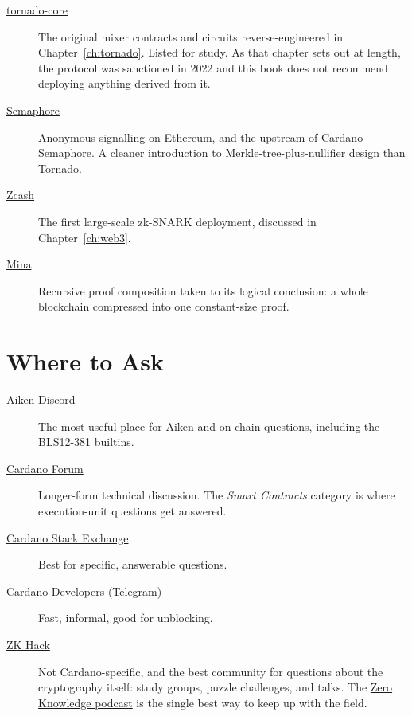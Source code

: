 \begin{description}
  \item[\href{https://github.com/tornadocash/tornado-core}{tornado-core}]
    The original mixer contracts and circuits reverse-engineered in
    Chapter~\ref{ch:tornado}. Listed for study. As that chapter sets out at
    length, the protocol was sanctioned in 2022 and this book does not
    recommend deploying anything derived from it.

  \item[\href{https://github.com/semaphore-protocol/semaphore}{Semaphore}]
    Anonymous signalling on Ethereum, and the upstream of Cardano-Semaphore.
    A cleaner introduction to Merkle-tree-plus-nullifier design than Tornado.

  \item[\href{https://github.com/zcash/zcash}{Zcash}]
    The first large-scale zk-SNARK deployment, discussed in
    Chapter~\ref{ch:web3}.

  \item[\href{https://github.com/MinaProtocol/mina}{Mina}]
    Recursive proof composition taken to its logical conclusion: a whole
    blockchain compressed into one constant-size proof.
\end{description}

\section{Where to Ask} \label{sec:sito-community}

\begin{description}
  \item[\href{https://discord.gg/aiken}{Aiken Discord}]
    The most useful place for Aiken and on-chain questions, including the
    BLS12-381 builtins.

  \item[\href{https://forum.cardano.org/}{Cardano Forum}]
    Longer-form technical discussion. The \emph{Smart Contracts} category is
    where execution-unit questions get answered.

  \item[\href{https://cardano.stackexchange.com/}{Cardano Stack Exchange}]
    Best for specific, answerable questions.

  \item[\href{https://t.me/CardanoDevelopersOfficial}{Cardano Developers (Telegram)}]
    Fast, informal, good for unblocking.

  \item[\href{https://zkhack.dev/}{ZK Hack}]
    Not Cardano-specific, and the best community for questions about the
    cryptography itself: study groups, puzzle challenges, and talks. The
    \href{https://zeroknowledge.fm/}{Zero Knowledge podcast} is the single
    best way to keep up with the field.
\end{description}

